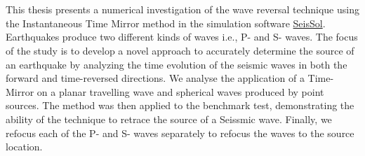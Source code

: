 \chapter{\abstractname}

This thesis presents a numerical investigation of the wave reversal technique using the Instantaneous 
Time Mirror method in the simulation software \href{https://seissol.org/}{SeisSol}. Earthquakes produce two different kinds of waves i.e., P- and S- waves. 
The focus of the study is to develop a novel approach to accurately determine the source of an earthquake by analyzing the time evolution 
of the seismic waves in both the forward and time-reversed directions. We analyse the application of a Time-Mirror on a planar travelling wave and spherical waves
produced by point sources. The method was then applied to the benchmark test, demonstrating the ability of the technique to retrace the source of a Seissmic wave. Finally, we refocus
each of the P- and S- waves separately to refocus the waves to the source location.